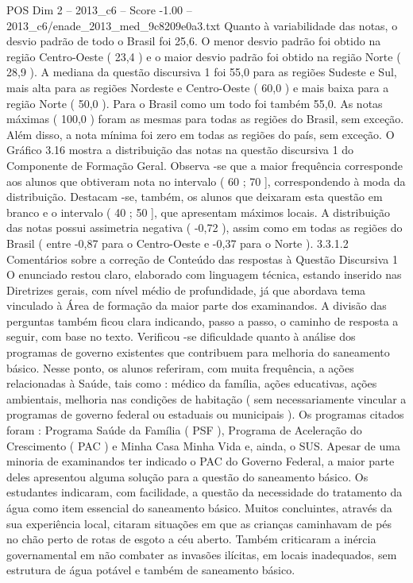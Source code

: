 \begin{textsample}{POS Dim 2 – 2013\_c6 – Score -1.00 – 2013\_c6/enade\_2013\_med\_9c8209e0a3.txt}
Quanto à variabilidade das notas, o desvio padrão de todo o Brasil foi 25,6.
O menor desvio padrão foi obtido na região Centro-Oeste ( 23,4 ) e o maior desvio padrão foi obtido na região Norte ( 28,9 ).
A mediana da questão discursiva 1 foi 55,0 para as regiões Sudeste e Sul, mais alta para as regiões Nordeste e Centro-Oeste ( 60,0 ) e mais baixa para a região Norte ( 50,0 ).
Para o Brasil como um todo foi também 55,0.
As notas máximas ( 100,0 ) foram as mesmas para todas as regiões do Brasil, sem exceção.
Além disso, a nota mínima foi zero em todas as regiões do país, sem exceção.
O Gráfico 3.16 mostra a distribuição das notas na questão discursiva 1 do Componente de Formação Geral.
Observa -se que a maior frequência corresponde aos alunos que obtiveram nota no intervalo ( 60 ; 70 ], correspondendo à moda da distribuição.
Destacam -se, também, os alunos que deixaram esta questão em branco e o intervalo ( 40 ; 50 ], que apresentam máximos locais.
A distribuição das notas possui assimetria negativa ( -0,72 ), assim como em todas as regiões do Brasil ( entre -0,87 para o Centro-Oeste e -0,37 para o Norte ). 3.3.1.2 Comentários sobre a correção de Conteúdo das respostas à Questão Discursiva 1 O enunciado restou claro, elaborado com linguagem técnica, estando inserido nas Diretrizes gerais, com nível médio de profundidade, já que abordava tema vinculado à Área de formação da maior parte dos examinandos.
A divisão das perguntas também ficou clara indicando, passo a passo, o caminho de resposta a seguir, com base no texto.
Verificou -se dificuldade quanto à análise dos programas de governo existentes que contribuem para melhoria do saneamento básico.
Nesse ponto, os alunos referiram, com muita frequência, a ações relacionadas à Saúde, tais como : médico da família, ações educativas, ações ambientais, melhoria nas condições de habitação ( sem necessariamente vincular a programas de governo federal ou estaduais ou municipais ).
Os programas citados foram : Programa Saúde da Família ( PSF ), Programa de Aceleração do Crescimento ( PAC ) e Minha Casa Minha Vida e, ainda, o SUS.
Apesar de uma minoria de examinandos ter indicado o PAC do Governo Federal, a maior parte deles apresentou alguma solução para a questão do saneamento básico.
Os estudantes indicaram, com facilidade, a questão da necessidade do tratamento da água como item essencial do saneamento básico.
Muitos concluintes, através da sua experiência local, citaram situações em que as crianças caminhavam de pés no chão perto de rotas de esgoto a céu aberto.
Também criticaram a inércia governamental em não combater as invasões ilícitas, em locais inadequados, sem estrutura de água potável e também de saneamento básico.

\end{textsample}
